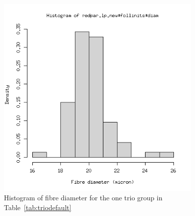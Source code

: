 %

\begin{figure}[h]
  \centering
   \includegraphics[width=0.9\textwidth]{onetriogpdiam.png}
  \caption{Histogram of fibre diameter for the  one trio group in Table~\ref{tab:triodefault}}
  \label{fig:onetriodiamhist}
\end{figure}

%

